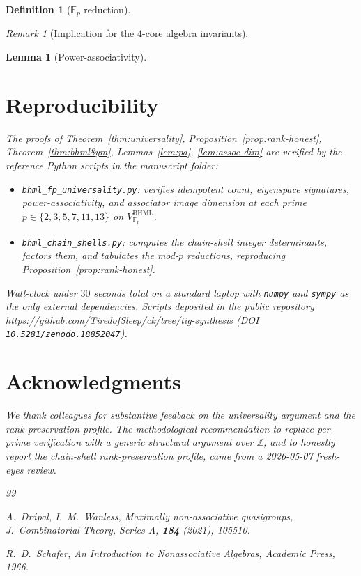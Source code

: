 \documentclass[11pt,reqno]{amsart}
\theoremstyle{plain}
\newtheorem{lemma}[theorem]{Lemma}
\theoremstyle{definition}
\newtheorem{definition}[theorem]{Definition}
\theoremstyle{remark}
\newtheorem*{remark}{Remark}
\newcommand{\Z}{\mathbb{Z}}
\newcommand{\F}{\mathbb{F}}
\newcommand{\BHML}{\mathrm{BHML}}
\begin{document}
\begin{definition}[$\F_{p}$ reduction]
\begin{remark}[Implication for the $4$-core algebra invariants]
\begin{lemma}[Power-associativity]
\section{Reproducibility}
\label{sec:repro}

The proofs of Theorem~\ref{thm:universality},
Proposition~\ref{prop:rank-honest}, Theorem~\ref{thm:bhml8ym},
Lemmas~\ref{lem:pa}, \ref{lem:assoc-dim} are verified by the
reference Python scripts in the manuscript folder:

\begin{itemize}
\item \texttt{bhml\_fp\_universality.py}: verifies idempotent count,
eigenspace signatures, power-associativity, and associator image
dimension at each prime $p \in \{2, 3, 5, 7, 11, 13\}$ on
$V^{\BHML}_{\F_{p}}$.
\item \texttt{bhml\_chain\_shells.py}: computes the chain-shell
integer determinants, factors them, and tabulates the mod-$p$
reductions, reproducing Proposition~\ref{prop:rank-honest}.
\end{itemize}

Wall-clock under $30$ seconds total on a standard laptop with
\texttt{numpy} and \texttt{sympy} as the only external dependencies.
Scripts deposited in the public repository
\url{https://github.com/TiredofSleep/ck/tree/tig-synthesis}
(DOI \texttt{10.5281/zenodo.18852047}).

\section*{Acknowledgments}
We thank colleagues for substantive feedback on the universality
argument and the rank-preservation profile. The methodological
recommendation to replace per-prime verification with a generic
structural argument over $\Z$, and to honestly report the
chain-shell rank-preservation profile, came from a 2026-05-07
fresh-eyes review.

\begin{thebibliography}{99}

A.~Drápal, I.~M.~Wanless,
\emph{Maximally non-associative quasigroups},
J.~Combinatorial Theory, Series A, \textbf{184} (2021), 105510.

R.~D.~Schafer,
\emph{An Introduction to Nonassociative Algebras},
Academic Press, 1966.


\end{thebibliography}
\end{lemma}
\end{remark}
\end{definition}
\end{document}
